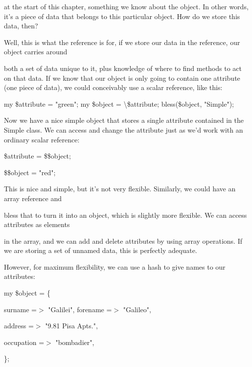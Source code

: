 \documentclass[a4paper,11pt]{book}
\begin{document}
\noindent at the start of this chapter, something we know about the object. In other words, it's a piece of data that belongs to this particular object. How do we store this data, then?

\noindent 

\noindent Well, this is what the reference is for, if we store our data in the reference, our object carries around

\noindent both a set of data unique to it, plus knowledge of where to find methods to act on that data. If we know that our object is only going to contain one attribute (one piece of data), we could conceivably use a scalar reference, like this:

\noindent 

\noindent my \$attribute = "green"; my \$object = \textbackslash \$attribute; bless(\$object, "Simple");

\noindent 

\noindent Now we have a nice simple object that stores a single attribute contained in the Simple class. We can access and change the attribute just as we'd work with an ordinary scalar reference:

\noindent 

\noindent \$attribute = \$\$object;

\noindent \$\$object = "red";

\noindent 

\noindent This is nice and simple, but it's not very flexible. Similarly, we could have an array reference and

\noindent bless that to turn it into an object, which is slightly more flexible. We can access attributes as elements

\noindent in the array, and we can add and delete attributes by using array operations. If we are storing a set of unnamed data, this is perfectly adequate.

\noindent 

\noindent 

\noindent However, for maximum flexibility, we can use a hash to give names to our attributes:

\noindent 

\noindent my \$object = \{

\noindent surname =$>$ "Galilei", forename =$>$ "Galileo",

\noindent address =$>$ "9.81 Pisa Apts.",

\noindent occupation =$>$ "bombadier",

\noindent \};
\end{document}
